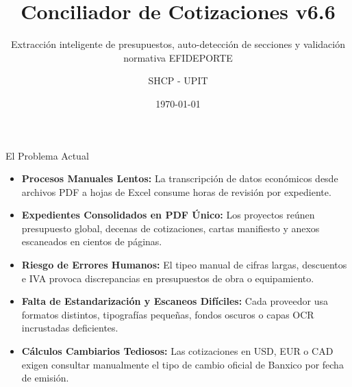 \documentclass[aspectratio=169, 11pt]{beamer}
\title[Conciliador v6.6]{Conciliador de Cotizaciones v6.6}
\subtitle{Extracción inteligente de presupuestos, auto-detección de secciones y validación normativa EFIDEPORTE}
\author[SHCP - UPIT]{SHCP - UPIT}
\date{\today}
\begin{document}
\begin{frame}
    \titlepage
\end{frame}

\begin{frame}{El Problema Actual}
    \begin{itemize}
        \item \textbf{Procesos Manuales Lentos:} La transcripción de datos económicos desde archivos PDF a hojas de Excel consume horas de revisión por expediente.
        \item \textbf{Expedientes Consolidados en PDF Único:} Los proyectos reúnen presupuesto global, decenas de cotizaciones, cartas manifiesto y anexos escaneados en cientos de páginas.
        \item \textbf{Riesgo de Errores Humanos:} El tipeo manual de cifras largas, descuentos e IVA provoca discrepancias en presupuestos de obra o equipamiento.
        \item \textbf{Falta de Estandarización y Escaneos Difíciles:} Cada proveedor usa formatos distintos, tipografías pequeñas, fondos oscuros o capas OCR incrustadas deficientes.
        \item \textbf{Cálculos Cambiarios Tediosos:} Las cotizaciones en USD, EUR o CAD exigen consultar manualmente el tipo de cambio oficial de Banxico por fecha de emisión.
    \end{itemize}
\end{frame}
\end{document}
